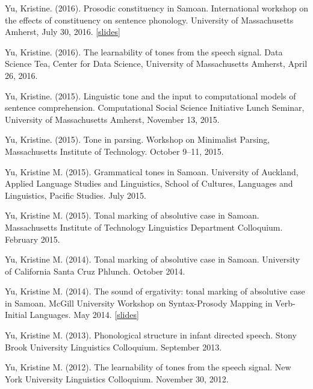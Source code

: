 \documentclass[10pt]{article}
\begin{document}
\begin{bibenum}
  \item Yu, Kristine. (2016). Prosodic constituency in Samoan. International workshop on the effects of
    constituency on sentence phonology. University of Massachusetts
    Amherst, July 30, 2016. [\href{https://speakerdeck.com/krisyu/prosodic-constituency-in-samoan}{slides}]

  \item Yu, Kristine. (2016). The learnability of tones from the
    speech signal. Data Science Tea, Center for Data
    Science, University of Massachusetts Amherst, April 26, 2016.

  \item Yu, Kristine. (2015). Linguistic tone and the input to
    computational models of sentence comprehension. Computational
    Social Science Initiative Lunch Seminar, University of
    Massachusetts Amherst, November 13, 2015.

  \item Yu, Kristine. (2015). Tone in parsing. Workshop on Minimalist
    Parsing, Massachusetts Institute of Technology. October 9--11, 2015.

    \item Yu, Kristine M. (2015). Grammatical tones in
      Samoan. University of Auckland, Applied Language Studies and Linguistics, School of Cultures, Languages and Linguistics, Pacific Studies. July 2015.

    \item Yu, Kristine M. (2015). Tonal marking of absolutive case in Samoan. Massachusetts Institute of
      Technology Linguistics Department Colloquium. February 2015.

    \item Yu, Kristine M. (2014). Tonal marking of absolutive case in
      Samoan. University of California Santa Cruz Phlunch. October 2014.

    \item Yu, Kristine M. (2014). The sound of ergativity: tonal
      marking of absolutive case in Samoan. McGill University Workshop
      on Syntax-Prosody Mapping in Verb-Initial Languages. May 2014. [\href{https://speakerdeck.com/krisyu/tonal-marking-of-absolutive-case-in-samoan}{slides}]

    \item Yu, Kristine M. (2013). Phonological structure in infant
      directed speech. Stony Brook University Linguistics Colloquium. September 2013.

    \item Yu, Kristine M. (2012). The learnability of tones from the
      speech signal. New York University Linguistics Colloquium. November 30, 2012. 


\end{bibenum}
\end{document}
